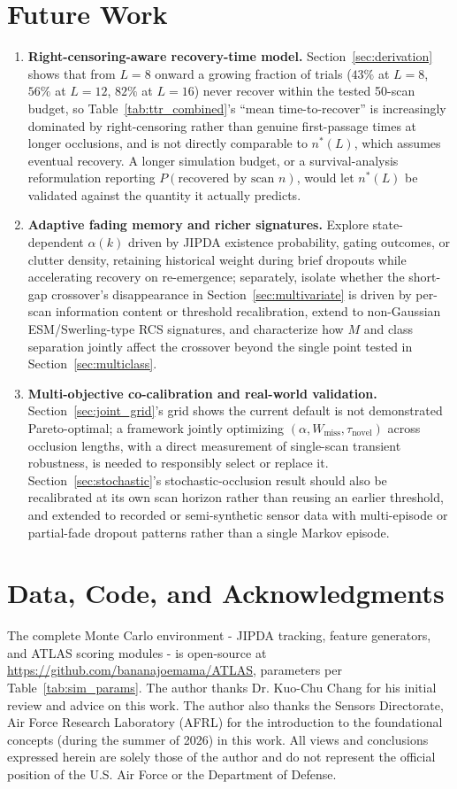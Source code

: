 \documentclass[conference]{IEEEtran}
\begin{document}
\section{Future Work}
\label{sec:future_work}
\begin{enumerate}
    \item \textbf{Right-censoring-aware recovery-time model.} Section~\ref{sec:derivation} shows that from $L=8$ onward a growing fraction of trials ($43\%$ at $L=8$, $56\%$ at $L=12$, $82\%$ at $L=16$) never recover within the tested 50-scan budget, so Table~\ref{tab:ttr_combined}'s ``mean time-to-recover'' is increasingly dominated by right-censoring rather than genuine first-passage times at longer occlusions, and is not directly comparable to $n^\ast(L)$, which assumes eventual recovery. A longer simulation budget, or a survival-analysis reformulation reporting $P(\text{recovered by scan }n)$, would let $n^\ast(L)$ be validated against the quantity it actually predicts.
    \item \textbf{Adaptive fading memory and richer signatures.} Explore state-dependent $\alpha(k)$ driven by JIPDA existence probability, gating outcomes, or clutter density, retaining historical weight during brief dropouts while accelerating recovery on re-emergence; separately, isolate whether the short-gap crossover's disappearance in Section~\ref{sec:multivariate} is driven by per-scan information content or threshold recalibration, extend to non-Gaussian ESM/Swerling-type RCS signatures, and characterize how $M$ and class separation jointly affect the crossover beyond the single point tested in Section~\ref{sec:multiclass}.
    \item \textbf{Multi-objective co-calibration and real-world validation.} Section~\ref{sec:joint_grid}'s grid shows the current default is not demonstrated Pareto-optimal; a framework jointly optimizing $(\alpha,W_{\text{miss}},\tau_{\text{novel}})$ across occlusion lengths, with a direct measurement of single-scan transient robustness, is needed to responsibly select or replace it. Section~\ref{sec:stochastic}'s stochastic-occlusion result should also be recalibrated at its own scan horizon rather than reusing an earlier threshold, and extended to recorded or semi-synthetic sensor data with multi-episode or partial-fade dropout patterns rather than a single Markov episode.
\end{enumerate}

\section*{Data, Code, and Acknowledgments}
The complete Monte Carlo environment - JIPDA tracking, feature generators, and ATLAS scoring modules - is open-source at \url{https://github.com/bananajoemama/ATLAS}, parameters per Table~\ref{tab:sim_params}. The author thanks Dr. Kuo-Chu Chang for his initial review and advice on this work. The author also thanks the Sensors Directorate, Air Force Research Laboratory (AFRL) for the introduction to the foundational concepts (during the summer of 2026) in this work. All views and conclusions expressed herein are solely those of the author and do not represent the official position of the U.S. Air Force or the Department of Defense. 


\small

\end{document}
